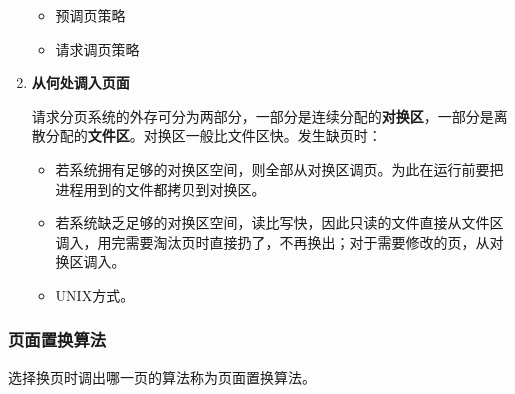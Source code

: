 \documentclass[12pt, a4paper, oneside]{ctexart}
\begin{document}
\begin{enumerate}
  \begin{itemize}
    \item 预调页策略
    \item 请求调页策略
  \end{itemize}

  \item {\bf 从何处调入页面}
  
  请求分页系统的外存可分为两部分，一部分是连续分配的\textbf{对换区}，一部分是离散分配的\textbf{文件区}。对换区一般比文件区快。发生缺页时：
  \begin{itemize}
    \item 若系统拥有足够的对换区空间，则全部从对换区调页。为此在运行前要把进程用到的文件都拷贝到对换区。
    \item 若系统缺乏足够的对换区空间，读比写快，因此只读的文件直接从文件区调入，用完需要淘汰页时直接扔了，不再换出；对于需要修改的页，从对换区调入。
    \item UNIX方式。
  \end{itemize}
\end{enumerate}

\subsubsection{页面置换算法}

选择换页时调出哪一页的算法称为页面置换算法。
\end{document}
